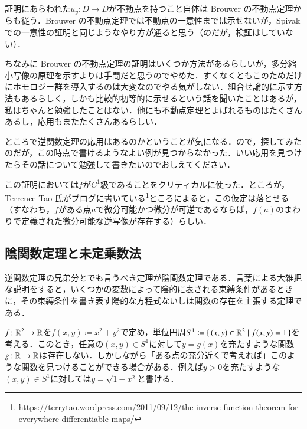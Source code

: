 \begin{que}[*]
証明にあらわれた$u_y \colon D \to D$が不動点を持つこと自体は Brouwer の不動点定理からも従う．Brouwer の不動点定理では不動点の一意性までは示せないが，Spivak での一意性の証明と同じようなやり方が通ると思う（のだが，検証はしていない）．
\end{que}

\begin{que}[**]
ちなみに Brouwer の不動点定理の証明はいくつか方法があるらしいが，多分縮小写像の原理を示すよりは手間だと思うのでやめた．すくなくともこのためだけにホモロジー群を導入するのは大変なのでやる気がしない．組合せ論的に示す方法もあるらしく，しかも比較的初等的に示せるという話を聞いたことはあるが，私はちゃんと勉強したことはない．他にも不動点定理とよばれるものはたくさんあるし，応用もまたたくさんあるらしい．
\end{que}

\begin{que}
ところで逆関数定理の応用はあるのかということが気になる．ので，探してみたのだが，この時点で書けるようなよい例が見つからなかった．いい応用を見つけたらその話について勉強して書きたいのでおしえてください．
\end{que}


\begin{que}[**]
この証明においては$f$が$C^1$級であることをクリティカルに使った．ところが，Terrence Tao 氏がブログに書いている\footnote{\url{https://terrytao.wordpress.com/2011/09/12/the-inverse-function-theorem-for-everywhere-differentiable-maps/}}ところによると，この仮定は落とせる（すなわち，$f$がある点$a$で微分可能かつ微分が可逆であるならば，$f(a)$のまわりで定義された微分可能な逆写像が存在する）らしい．
\end{que}

\subsection{陰関数定理と未定乗数法}

逆関数定理の兄弟分とでも言うべき定理が陰関数定理である．言葉による大雑把な説明をすると，いくつかの変数によって陰的に表される束縛条件があるときに，その束縛条件を書き表す陽的な方程式ないしは関数の存在を主張する定理である．

\begin{exm}
$f \colon \mathbb{R}^2 \to \mathbb{R}$を$f(x,y) \coloneqq x^2 + y^2$で定め，単位円周$S^1 \coloneqq \set{(x,y) \in \mathbb{R}^2 | f(x,y) = 1}$を考える．このとき，任意の$(x,y) \in S^1$に対して$y=g(x)$を充たすような関数$g \colon \mathbb{R} \to \mathbb{R}$は存在しない．しかしながら「ある点の充分近くで考えれば」このような関数を見つけることができる場合がある．例えば$y > 0$を充たすような$(x,y) \in S^1$に対しては$y = \sqrt{1-x^2}$と書ける．
\end{exm}

